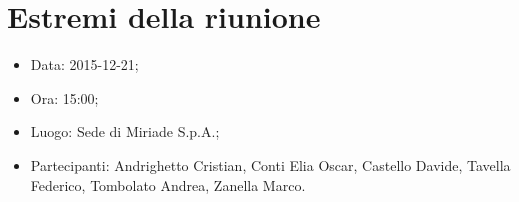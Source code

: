 \documentclass[../Riunione2015-12-21.tex]{subfiles}
\begin{document}
\section{Estremi della riunione}
	\begin{itemize}
		\item Data: 2015-12-21;
		\item Ora: 15:00;
		\item Luogo: Sede di Miriade S.p.A.;
		\item Partecipanti: Andrighetto Cristian, Conti Elia Oscar, Castello Davide, Tavella Federico, Tombolato Andrea, Zanella Marco.
	\end{itemize}
\end{document}
